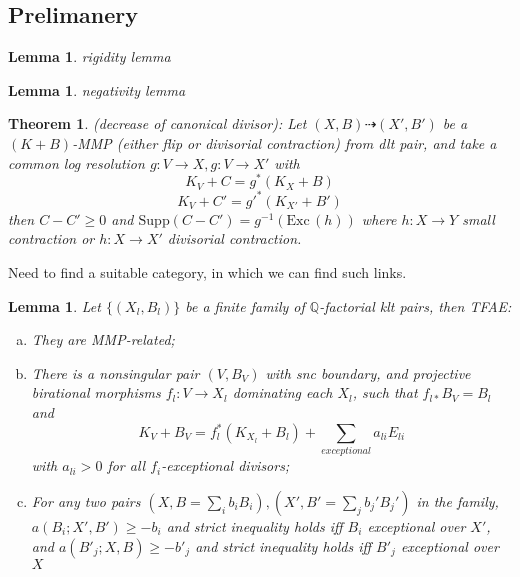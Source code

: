 \documentclass{article}
\newtheorem{lem}[defn]{Lemma}
\newtheorem{thm}[defn]{Theorem}
\begin{document}
\subsection{Prelimanery}
\begin{lem}
  rigidity lemma
\end{lem}

\begin{lem}
  negativity lemma
\end{lem}


\begin{thm} \label{decrease}
  (decrease of canonical divisor): Let $ (X,B)\dashrightarrow (X',B') $ be a $ (K+B) $-MMP (either flip or divisorial contraction) from dlt pair, and take a common log resolution $ g:V\to X, g:V\to X' $ with 
  $$ K_V+C=g^*(K_X+B) $$
  $$  K_V+C'=g'^*(K_{X'}+B') $$
  then $ C-C'\geqslant0 $ and $ \mathrm{Supp}(C-C')=g^{-1}(\mathrm{Exc}\,(h)) $ where $ h:X\to Y $ small contraction or $ h:X\to X' $ divisorial contraction.
\end{thm}

Need to find a suitable category, in which we can find such links.


\begin{lem}
  Let $ \{(X_l,B_l)\} $ be a finite family of $ \mathbb{Q} $-factorial klt pairs, then TFAE:
  \begin{enumerate}[(a)]
    \item They are MMP-related;
    \item There is a nonsingular pair $ (V,B_V) $ with snc boundary, and projective birational morphisms $ f_l:V\to  X_l $ dominating each $ X_l $, such that $ f_{l*}B_V=B_l $ and
    $$ K_V+B_V=f_l^*(K_{X_l}+B_l)+\sum_{exceptional}{a_{li}E_{li}} $$
    with $ a_{li}>0 $ for all $ f_i $-exceptional divisors;
    \item For any two pairs $ (X,B=\sum_ib_iB_i),(X',B'=\sum _jb_j'B_j') $ in the family,  $ a(B_i;X',B')\geqslant -b_i $ and strict inequality holds iff $ B_i $ exceptional over $ X' $, and $ a(B'_j;X,B)\geqslant -b'_j $ and strict inequality holds iff $ B'_j $ exceptional over $ X $
  \end{enumerate}
\end{lem}
\end{document}
